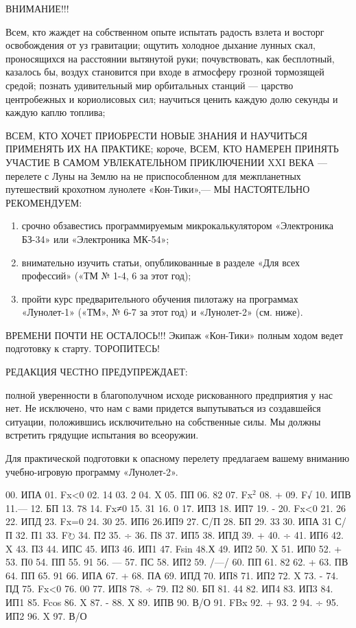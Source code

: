 \documentclass[11pt,a4paper,oneside]{article}
\def\FO{F$\circlearrowright$}
\begin{document}
ВНИМАНИЕ!!!

Всем, кто жаждет на собственном опыте испытать радость взлета и восторг освобождения от уз гравитации;
ощутить холодное дыхание лунных скал, проносящихся на расстоянии вытянутой руки;
почувствовать, как бесплотный, казалось бы, воздух становится при входе в атмосферу грозной тормозящей средой;
познать удивительный мир орбитальных станций — царство центробежных и кориолисовых сил;
научиться ценить каждую долю секунды и каждую каплю топлива;

ВСЕМ, КТО ХОЧЕТ ПРИОБРЕСТИ НОВЫЕ ЗНАНИЯ И НАУЧИТЬСЯ ПРИМЕНЯТЬ ИХ НА ПРАКТИКЕ;
короче, ВСЕМ, КТО НАМЕРЕН ПРИНЯТЬ УЧАСТИЕ В САМОМ УВЛЕКАТЕЛЬНОМ ПРИКЛЮЧЕНИИ XXI ВЕКА — перелете с Луны на Землю на не приспособленном для межпланетных путешествий крохотном лунолете «Кон-Тики»,— МЫ НАСТОЯТЕЛЬНО РЕКОМЕНДУЕМ:

\begin{enumerate}
\item	срочно обзавестись программируемым микрокалькулятором «Электроника БЗ-34» или «Электроника МК-54»;
\item	внимательно изучить статьи, опубликованные в разделе «Для всех профессий» («ТМ № 1-4, 6 за этот год);
\item	пройти курс предварительного обучения пилотажу на программах «Лунолет-1» («ТМ», № 6-7 за этот год) и «Лунолет-2» (см. ниже).
\end{enumerate}

ВРЕМЕНИ ПОЧТИ НЕ ОСТАЛОСЬ!!! Экипаж «Кон-Тики» полным ходом ведет подготовку к старту. ТОРОПИТЕСЬ!

РЕДАКЦИЯ ЧЕСТНО ПРЕДУПРЕЖДАЕТ:

полной уверенности в благополучном исходе рискованного предприятия у нас нет. Не исключено, что нам с вами придется выпутываться из создавшейся ситуации, положившись исключительно на собственные силы. Мы должны встретить грядущие испытания во всеоружии.

Для практической подготовки к опасному перелету предлагаем вашему вниманию учебно-игровую программу «Лунолет-2».

00. ИПА 01. Fx<0 02. 14 03. 2 04. X 05. ПП 06. 82 07. Fx$^{2}$ 08. + 09. F√ 10. ИПВ 11.— 12. БП 13. 78 14. Fx≠0 15. 31 16. 0 17. ИПЗ 18. ИП7 19. -
20. 	Fx<0 21. 26 22. ИПД 23. Fx=0 24. 30 25. ИП6 26.ИП9 27. С/П 28. БП 29. 33 30. ИПА 31 С/П 32. П1 33. \FO
34. 	П2 35. ÷ 36. П8 37. ИП5 38. ИПД 39. + 40. ÷ 41. ИП6 42. X 43. П3 44. ИПС 45. ИП3 46. ИП1 47. Fsin 48.Х 49. ИП2 50. X 51. ИП0 52. + 53. П0 54. ПП 55. 91 56. — 57. ПС 58. ИП2 59. /—/ 60. ПП 61. 82 62. + 63. ПВ 64. ПП 65. 91 66. ИПА 67. + 68. ПА 69. ИПД 70. ИП8 71. ИП2 72. X 73. -
74. 	ПД 75. Fx<0 76. 00 77. ИП8 78. ÷ 79. П2 80. БП 81. 44 82. ИП4 83. ИП3 84. ИП1 85. Fcos 86. X 87. - 88. X 89. ИПВ 90. В/О 91. FBx 92. + 93. 2
94. 	÷ 95. ИП2 96. X 97. В/О
\end{document}
